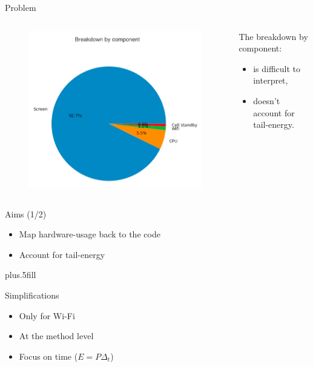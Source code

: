 \begin{frame}{Problem}
\begin{columns}
\begin{column}{0.5\textwidth}
\begin{figure}
	\includegraphics[width=\textwidth]{figures/hw_breakdown.png} 
\end{figure}
\end{column}
\begin{column}{0.5\textwidth}
The breakdown by component:
\begin{itemize}
\item is \alert{difficult to interpret},
\item doesn't account for \alert{tail-energy}.
\end{itemize}
\end{column}
\end{columns}
\end{frame}
%
%
\begin{frame}{Aims (1/2)}
\begin{itemize}
\item Map hardware-usage back to the code
\item Account for tail-energy
\end{itemize}
\vskip0pt plus.5fill
\begin{block}{Simplifications}
\begin{itemize}
\item Only for Wi-Fi
\item At the method level
\item Focus on time ($E= P \Delta_t$)
\end{itemize}
\end{block}
\end{frame}

